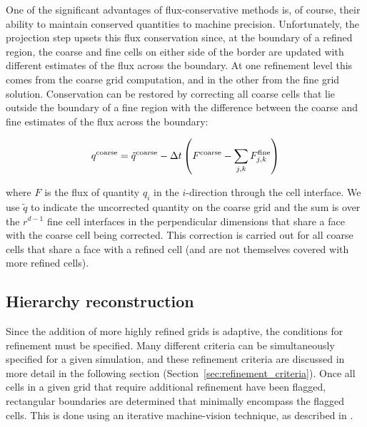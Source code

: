 One of the significant advantages of flux-conservative methods is, of course, their ability to maintain conserved quantities to machine precision.  Unfortunately, the projection step upsets this flux conservation since, at the boundary of a refined region, the coarse and fine cells on either side of the border are updated with different estimates of the flux across the boundary.  At one refinement level this comes from the coarse grid computation, and in the other from the fine grid solution.  Conservation can be restored by correcting all coarse cells that lie outside the boundary of a fine region
with the difference between the coarse and fine estimates of the flux across the boundary:

\begin{equation}
  q^{\rm coarse} = \tilde{q}^{\rm coarse} - \Delta t \left( F^{\rm
      coarse} - \sum_{j,k} F^{\rm fine}_{j,k} \right)
\end{equation}

where $F$ is the flux of quantity $q_i$ in the $i$-direction through the cell interface.   We use $\tilde{q}$ to indicate the uncorrected quantity on the coarse grid and the sum is over the $r^{d-1}$ fine cell interfaces in the perpendicular dimensions that share a face with the coarse cell being corrected.  This correction is carried out for all coarse cells that share a face with a refined cell (and are not themselves covered with more refined cells).

\subsection{Hierarchy reconstruction}
\label{sec:hierarchy_reconstruction}

Since the addition of more highly refined grids is adaptive, the conditions for refinement must be specified. Many different criteria can be simultaneously specified for a given simulation, and these refinement criteria are discussed in more detail in the following section (Section~\ref{sec:refinement_criteria}).   Once all cells in a given grid that require additional refinement have been flagged, rectangular boundaries are determined that minimally encompass the flagged cells.  This is done using an iterative machine-vision technique, as described in .  


